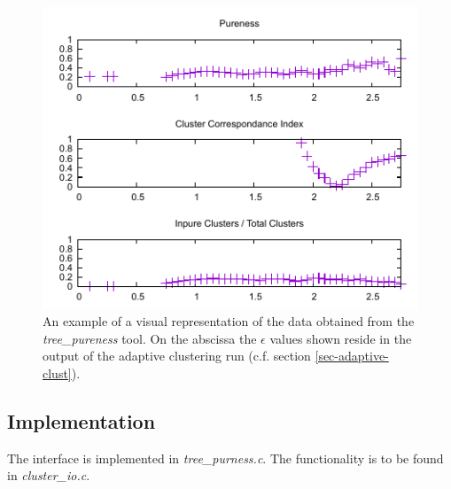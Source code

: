 \begin{figure}
  \begin{center}
    \includegraphics[scale=1.4]{pureness-example.pdf}
    \caption{An example of a visual representation of the data
      obtained from the \emph{tree\_pureness} tool. On the abscissa
      the $\epsilon$ values shown reside in the output of
      the adaptive clustering run (c.f. section \ref{sec-adaptive-clust}).}
    \label{fig-pureness-example}
  \end{center}
\end{figure}

\subsection{Implementation}
The interface is implemented in \emph{tree\_purness.c}. The
functionality is to be found in \emph{cluster\_io.c}. 

